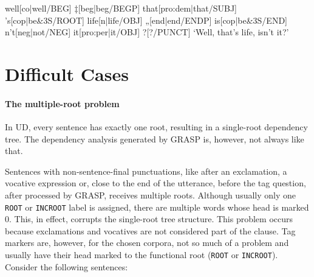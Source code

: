 \begin{minipage}{\widefigurewidth}
\ex
\begingl[glstyle=nlevel]
well[co|well/BEG]
‡[beg|beg/BEGP]
that[pro:dem|that/SUBJ]
's[cop|be\&3S/ROOT]
life[n|life/OBJ]
„[end|end/ENDP]
is[cop|be\&3S/END]
n't[neg|not/NEG]
it[pro:per|it/OBJ]
?[?/PUNCT]
\glft ‘Well, that's life, isn't it?’
\endgl
\xe
\end{minipage}

\section{Difficult Cases}
\label{sec:grdifficult}
\paragraph{The multiple-root problem}
In UD, every sentence has exactly one root, resulting in a single-root dependency tree. The dependency analysis generated by GRASP is, however, not always like that.

Sentences with non-sentence-final punctuations, like after an exclamation, a vocative expression or, close to the end of the utterance, before the tag question, after processed by GRASP, receives multiple roots. Although usually only one \texttt{ROOT} or \texttt{INCROOT} label is assigned, there are multiple words whose head is marked 0. This, in effect, corrupts the single-root tree structure. This problem occurs because exclamations and vocatives are not considered part of the clause. Tag markers are, however, for the chosen corpora, not so much of a problem and usually have their head marked to the functional root (\texttt{ROOT} or \texttt{INCROOT}). Consider the following sentences:




